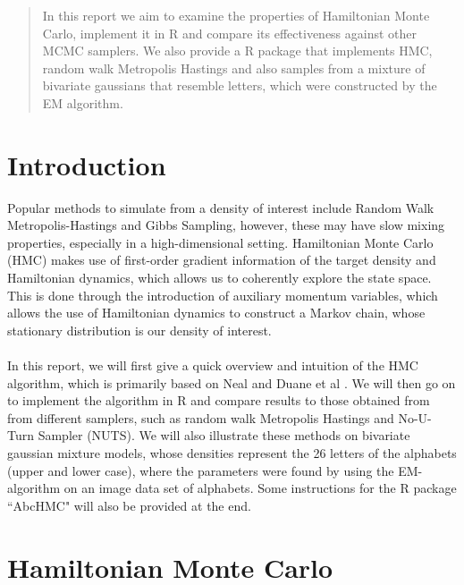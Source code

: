 \documentclass[11pt]{article}
\begin{document}
\maketitle

\begin{abstract}
\noindent In this report we aim to examine the properties of Hamiltonian Monte Carlo, implement it in R and compare its effectiveness against other MCMC samplers. We also provide a R package that implements HMC, random walk Metropolis Hastings and also samples from a mixture of bivariate gaussians that resemble letters, which were constructed by the EM algorithm.   
\end{abstract}
\newpage
\section{Introduction}
Popular methods to simulate from a density of interest include Random Walk Metropolis-Hastings and Gibbs Sampling, however, these may have slow mixing properties, especially in a high-dimensional setting. Hamiltonian Monte Carlo (HMC) makes use of first-order gradient information of the target density and Hamiltonian dynamics, which allows us to coherently explore the state space. This is done through the introduction of auxiliary momentum variables, which allows the use of Hamiltonian dynamics to construct a Markov chain, whose stationary distribution is our density of interest. 
\\
\\
In this report, we will first give a quick overview and intuition of the HMC algorithm, which is primarily based on Neal \cite{neal} and Duane et al \cite{duane}. We will then go on to implement the algorithm in R and compare results to those obtained from from different samplers, such as random walk Metropolis Hastings and No-U-Turn Sampler (NUTS). We will also illustrate these methods on bivariate gaussian mixture models, whose densities represent the 26 letters of the alphabets (upper and lower case), where the parameters were found by using the EM-algorithm on an image data set of alphabets. Some instructions for the R package ``AbcHMC" will also be provided at the end.
\section{Hamiltonian Monte Carlo}
\end{document}
